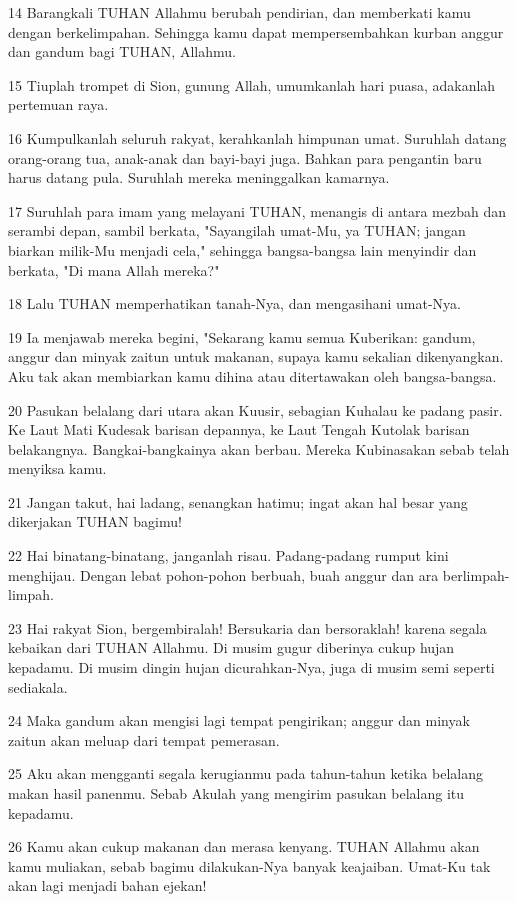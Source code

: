 \par 14 Barangkali TUHAN Allahmu berubah pendirian, dan memberkati kamu dengan berkelimpahan. Sehingga kamu dapat mempersembahkan kurban anggur dan gandum bagi TUHAN, Allahmu.
\par 15 Tiuplah trompet di Sion, gunung Allah, umumkanlah hari puasa, adakanlah pertemuan raya.
\par 16 Kumpulkanlah seluruh rakyat, kerahkanlah himpunan umat. Suruhlah datang orang-orang tua, anak-anak dan bayi-bayi juga. Bahkan para pengantin baru harus datang pula. Suruhlah mereka meninggalkan kamarnya.
\par 17 Suruhlah para imam yang melayani TUHAN, menangis di antara mezbah dan serambi depan, sambil berkata, "Sayangilah umat-Mu, ya TUHAN; jangan biarkan milik-Mu menjadi cela," sehingga bangsa-bangsa lain menyindir dan berkata, "Di mana Allah mereka?"
\par 18 Lalu TUHAN memperhatikan tanah-Nya, dan mengasihani umat-Nya.
\par 19 Ia menjawab mereka begini, "Sekarang kamu semua Kuberikan: gandum, anggur dan minyak zaitun untuk makanan, supaya kamu sekalian dikenyangkan. Aku tak akan membiarkan kamu dihina atau ditertawakan oleh bangsa-bangsa.
\par 20 Pasukan belalang dari utara akan Kuusir, sebagian Kuhalau ke padang pasir. Ke Laut Mati Kudesak barisan depannya, ke Laut Tengah Kutolak barisan belakangnya. Bangkai-bangkainya akan berbau. Mereka Kubinasakan sebab telah menyiksa kamu.
\par 21 Jangan takut, hai ladang, senangkan hatimu; ingat akan hal besar yang dikerjakan TUHAN bagimu!
\par 22 Hai binatang-binatang, janganlah risau. Padang-padang rumput kini menghijau. Dengan lebat pohon-pohon berbuah, buah anggur dan ara berlimpah-limpah.
\par 23 Hai rakyat Sion, bergembiralah! Bersukaria dan bersoraklah! karena segala kebaikan dari TUHAN Allahmu. Di musim gugur diberinya cukup hujan kepadamu. Di musim dingin hujan dicurahkan-Nya, juga di musim semi seperti sediakala.
\par 24 Maka gandum akan mengisi lagi tempat pengirikan; anggur dan minyak zaitun akan meluap dari tempat pemerasan.
\par 25 Aku akan mengganti segala kerugianmu pada tahun-tahun ketika belalang makan hasil panenmu. Sebab Akulah yang mengirim pasukan belalang itu kepadamu.
\par 26 Kamu akan cukup makanan dan merasa kenyang. TUHAN Allahmu akan kamu muliakan, sebab bagimu dilakukan-Nya banyak keajaiban. Umat-Ku tak akan lagi menjadi bahan ejekan!
